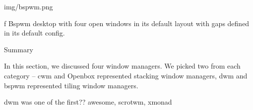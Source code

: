 \midinsert
\picw=12cm \cinspic img/bspwm.png
\caption/f Bspwm desktop with four open windows in its default layout with gaps defined in its default config.
\endinsert

\secc Summary

In this section, we discussed four window managers.
We picked two from each category -- cwm and Openbox represented stacking window managers,
dwm and bspwm represented tiling window managers.


dwm was one of the first?? awesome, scrotwm, xmonad




